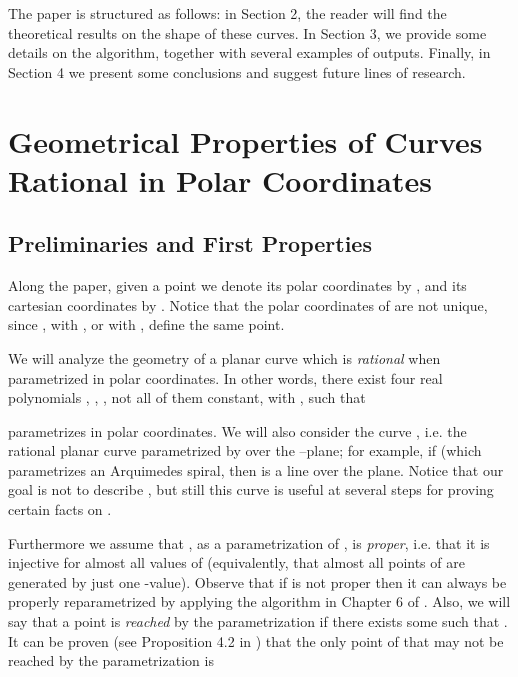 \documentclass{elsart}
\begin{document}
The paper is structured as follows: in Section 2, the reader will find the theoretical results on the shape of these curves. In Section 3, we provide some details on the algorithm, together with several examples of outputs. Finally, in Section 4 we present some conclusions and suggest future lines of research.










\section{Geometrical Properties of Curves Rational in Polar Coordinates}\label{sec-background}

\subsection{Preliminaries and First Properties}\label{subsec-prelim}

Along the paper, given a point  we denote its polar coordinates by , and its cartesian coordinates by .
Notice that the polar coordinates of  are not unique, since ,  with , or
 with , define the same point.


We will analyze the geometry of a planar curve
 which is {\it rational} when parametrized in polar coordinates. In other words, there exist four real
polynomials , , ,  not all of them constant, with , such that

parametrizes  in polar coordinates. We will also consider the curve , i.e. the rational planar curve parametrized by  over the --plane; for example, if  (which parametrizes an Arquimedes spiral, then  is a line over the  plane. Notice that our goal is not to describe , but still this curve is useful at several steps for proving certain facts on . 

Furthermore we assume that , as a parametrization of , is {\it proper}, i.e. that it is
injective for almost all values of 
(equivalently, that almost all points of  are generated by just one -value). Observe that if  is not proper then it can always be properly reparametrized by applying the algorithm
in Chapter 6 of \cite{SWPD}. Also, we will say that a point  is {\it reached} by the parametrization if there exists some
 such that . It can be proven (see Proposition 4.2 in \cite{Andradas})
 that the only point of  that may not be reached by the parametrization is
\end{document}

